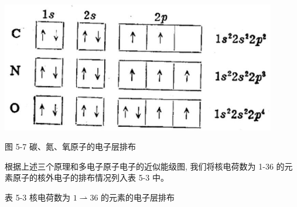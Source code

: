 \documentclass[10pt]{article}
\begin{document}
\begin{center}
\includegraphics[max width=0.9\textwidth]{images/01912d0f-097c-7e75-8f32-4f326cd86c9f_118_325547.jpg}
\end{center}

图 5-7 碳、氮、氧原子的电子层排布

根据上述三个原理和多电子原子电子的近似能级图, 我们将核电荷数为 1-36 的元素原子的核外电子的排布情况列入表 5-3 中。

表 5-3 核电荷数为 \(1 \rightharpoonup {36}\) 的元素的电子层排布
\end{document}
